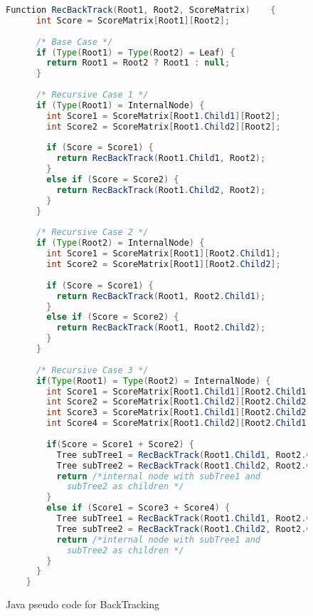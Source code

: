 \begin{figure}
	\begin{lstlisting}[language=Java]
	Function RecBackTrack(Root1, Root2, ScoreMatrix)	{
	  int Score = ScoreMatrix[Root1][Root2];
	  
	  /* Base Case */
	  if (Type(Root1) = Type(Root2) = Leaf) {
	    return Root1 = Root2 ? Root1 : null; 
	  }
	  
	  /* Recursive Case 1 */
	  if (Type(Root1) = InternalNode) {
	    int Score1 = ScoreMatrix[Root1.Child1][Root2]; 
	    int Score2 = ScoreMatrix[Root1.Child2][Root2];
	  
	    if (Score = Score1) {
	      return RecBackTrack(Root1.Child1, Root2);
	    }
	    else if (Score = Score2) {
	      return RecBackTrack(Root1.Child2, Root2);
	    }
	  }
	  
	  /* Recursive Case 2 */
	  if (Type(Root2) = InternalNode) {
	    int Score1 = ScoreMatrix[Root1][Root2.Child1]; 
	    int Score2 = ScoreMatrix[Root1][Root2.Child2];
	  
	    if (Score = Score1) {
	      return RecBackTrack(Root1, Root2.Child1);
	    }
	    else if (Score = Score2) {
	      return RecBackTrack(Root1, Root2.Child2);
	    }
	  }	
	  
	  /* Recursive Case 3 */
	  if(Type(Root1) = Type(Root2) = InternalNode) {
	    int Score1 = ScoreMatrix[Root1.Child1][Root2.Child1];
	    int Score2 = ScoreMatrix[Root1.Child2][Root2.Child2];
	    int Score3 = ScoreMatrix[Root1.Child1][Root2.Child2];
	    int Score4 = ScoreMatrix[Root1.Child2][Root2.Child1];
	
	    if(Score = Score1 + Score2) {
	      Tree subTree1 = RecBackTrack(Root1.Child1, Root2.Child1);
	      Tree subTree2 = RecBackTrack(Root1.Child2, Root2.Child2);
	      return /*internal node with subTree1 and 
	        subTree2 as children */
	    }
	    else if (Score1 = Score3 + Score4) {
	      Tree subTree1 = RecBackTrack(Root1.Child1, Root2.Child2);
          Tree subTree2 = RecBackTrack(Root1.Child2, Root2.Child1);
	      return /*internal node with subTree1 and 
	        subTree2 as children */
	    }
	  }
	}
	\end{lstlisting}
	\caption{Java pseudo code for BackTracking}
	\label{Code:Backtracking1}
\end{figure}	

